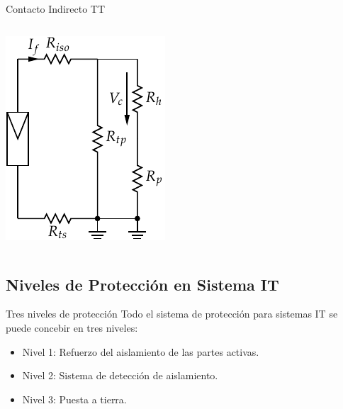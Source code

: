 \documentclass[xcolor={usenames,svgnames,dvipsnames}]{beamer}
\begin{document}
\begin{frame}[label={sec:org8bac7b4}]{Contacto Indirecto TT}
\begin{columns}
\begin{column}{0.5\columnwidth}
\begin{center}
\includegraphics[width=\textwidth]{../figs/ContactoIndirectoTT_simple.pdf}
\end{center}
\end{column}
\end{columns}
\end{frame}


\subsection{Niveles de Protección en Sistema IT}
\label{sec:org38670cc}


\begin{frame}[label={sec:org4084ba8}]{Tres niveles de protección}
Todo el sistema de protección para sistemas IT se puede concebir en tres
niveles:

\begin{itemize}
\item Nivel 1: Refuerzo del aislamiento de las partes activas.

\item Nivel 2: Sistema de detección de aislamiento.

\item Nivel 3: Puesta a tierra.
\end{itemize}
\end{frame}
\end{document}
